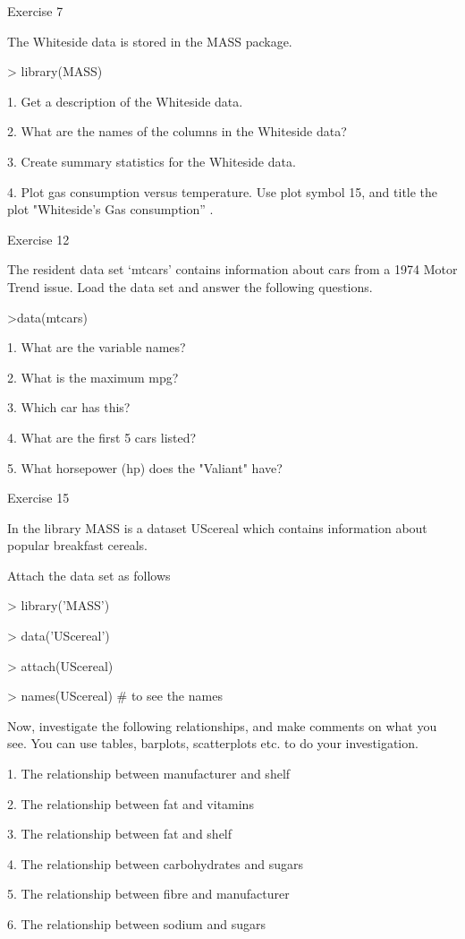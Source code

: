  Exercise 7
 
 
 
 The Whiteside data is stored in the MASS package.
 
 
 
 > library(MASS)
 
 
 1.
 Get a description of the Whiteside data.
 
 2.
 What are the names of the columns in the Whiteside data?
 
 3.
 Create summary statistics for the Whiteside data.
 
 4.
 Plot gas consumption versus temperature. Use plot symbol 15, and title the plot "Whiteside’s Gas consumption” .
 
 Exercise 12



The resident data set ‘mtcars’ contains information about cars from a 1974 Motor Trend issue. Load the data set and answer the following questions.

>data(mtcars)



1. What are the variable names?

2. What is the maximum mpg?

3. Which car has this?

4. What are the first 5 cars listed?

5. What horsepower (hp) does the "Valiant" have?


Exercise 15

 

In the library MASS is a dataset UScereal which contains information about popular breakfast cereals.

 

Attach the data set as follows

> library('MASS')

> data('UScereal')

> attach(UScereal)

> names(UScereal)         # to see the names

 

Now, investigate the following relationships, and make comments on what you see. You can use tables, barplots, scatterplots etc. to do your investigation.

 

1. The relationship between manufacturer and shelf

2. The relationship between fat and vitamins

3. The relationship between fat and shelf

4. The relationship between carbohydrates and sugars

5. The relationship between fibre and manufacturer

6. The relationship between sodium and sugars

 